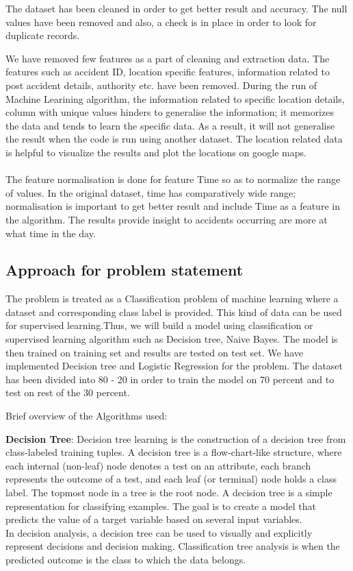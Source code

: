 \documentclass{acm_proc_article-sp}
\begin{document}
The dataset has been cleaned in order to get better result and accuracy. The null values have been removed and also, a check is in place in order to look for duplicate records. 

We have removed few features as a part of cleaning and extraction data. The features such as accident ID, location specific features, information related to post accident details, authority etc. have been removed. During the run of Machine Learining algorithm, the information related to specific location details, column with unique values hinders to generalise the information; it memorizes the data and tends to learn the specific data. As a result, it will not generalise the result when the code is run using another dataset. The location related data is helpful to visualize the results and plot the locations on google maps.\\
\\
The feature normalisation is done for feature Time so as to normalize the range of values. In the original dataset, time has comparatively wide range; normalisation is important to get better result and include Time as a feature in the algorithm. The results provide insight to accidents occurring are more at what time in the day. 

\subsection{Approach for problem statement}


The problem is treated as a Classification problem of machine learning where a dataset and corresponding class label is provided. This kind of data can be used for supervised learning.Thus, we will build a model using classification or supervised learning algorithm such as Decision tree, Naive Bayes. The model is then trained on training set and results are tested on test set.
We have implemented Decision tree and Logistic Regression for the problem. The dataset has been divided into 80 - 20 in order to train the model on 70 percent and to test on rest of the 30 percent. 

Brief overview of the Algorithms used:

\textbf{Decision Tree}: Decision tree learning is the construction of a decision tree from class-labeled training tuples. A decision tree is a flow-chart-like structure, where each internal (non-leaf) node denotes a test on an attribute, each branch represents the outcome of a test, and each leaf (or terminal) node holds a class label. The topmost node in a tree is the root node. A decision tree is a simple representation for classifying examples. The goal is to create a model that predicts the value of a target variable based on several input variables.\\
In decision analysis, a decision tree can be used to visually and explicitly represent decisions and decision making. Classification tree analysis is when the predicted outcome is the class to which the data belongs. \cite{dtree}
\end{document}
